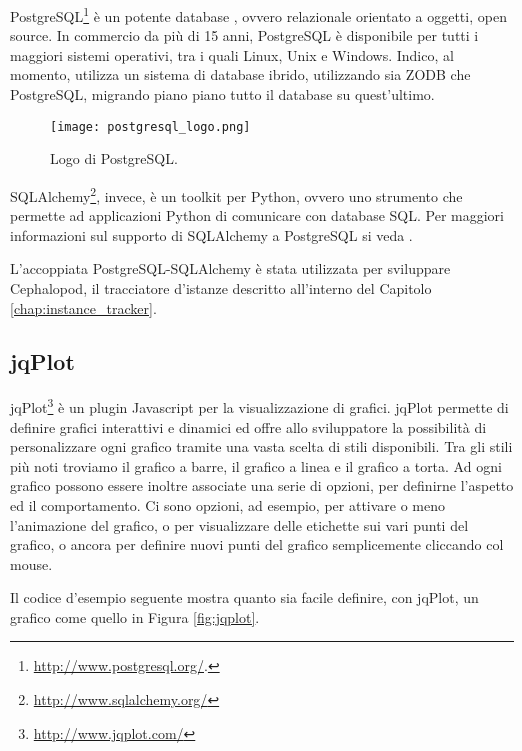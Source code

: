             PostgreSQL\footnote{\url{http://www.postgresql.org/}.} è un potente database , ovvero relazionale orientato a oggetti, open source. In commercio da più di 15 anni, PostgreSQL è disponibile per tutti i maggiori sistemi operativi, tra i quali Linux, Unix e Windows. Indico, al momento, utilizza un sistema di database ibrido, utilizzando sia \ac{ZODB} che PostgreSQL, migrando piano piano tutto il database su quest'ultimo.
            
        	\begin{figure}[h!]
        		\begin{center}
        			\texttt{[image: postgresql\_logo.png]}
        		\end{center}
        		\caption[Logo di PostgreSQL]{Logo di PostgreSQL.}
        		\label{fig:postgresql_logo}
        	\end{figure}
        	
        	SQLAlchemy\footnote{\url{http://www.sqlalchemy.org/}}, invece, è un toolkit  per Python, ovvero uno strumento che permette ad applicazioni Python di comunicare con database \ac{SQL}. Per maggiori informazioni sul supporto di SQLAlchemy a PostgreSQL si veda \cite{sqlalchemy:postgresql}.
        	
        	L'accoppiata PostgreSQL-SQLAlchemy è stata utilizzata per sviluppare Cephalopod, il tracciatore d'istanze descritto all'interno del Capitolo \ref{chap:instance_tracker}.
        
        \subsection{jqPlot} \label{subsec:p;sl;jqplot}
        
            jqPlot\footnote{\url{http://www.jqplot.com/}} è un plugin Javascript per la visualizzazione di grafici. jqPlot permette di definire grafici interattivi e dinamici ed offre allo sviluppatore la possibilità di personalizzare ogni grafico tramite una vasta scelta di stili disponibili. Tra gli stili più noti troviamo il grafico a barre, il grafico a linea e il grafico a torta. Ad ogni grafico possono essere inoltre associate una serie di opzioni, per definirne l'aspetto ed il comportamento. Ci sono opzioni, ad esempio, per attivare o meno l'animazione del grafico, o per visualizzare delle etichette sui vari punti del grafico, o ancora per definire nuovi punti del grafico semplicemente cliccando col mouse.
            
            Il codice d'esempio seguente mostra quanto sia facile definire, con jqPlot, un grafico come quello in Figura \ref{fig:jqplot}.
            
